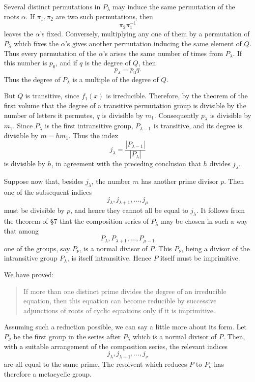 \documentclass[11pt,a4paper]{book}
\begin{document}
Several distinct permutations in \(P_\lambda\) may induce the same permutation of the roots \(\alpha\).  If \(\pi_1,\pi_2\) are two such permutations, then
\[
 \pi_2\pi_1^{-1}
\]
leaves the \(\alpha\)'s fixed.  Conversely, multiplying any one of them by a permutation of \(P_\lambda\) which fixes the \(\alpha\)'s gives another permutation inducing the same element of \(Q\).  Thus every permutation of the \(\alpha\)'s arises the same number of times from \(P_\lambda\).  If this number is \(p_0\), and if \(q\) is the degree of \(Q\), then
\[
 p_\lambda=p_0q.
\]
Thus the degree of \(P_\lambda\) is a multiple of the degree of \(Q\).

But \(Q\) is transitive, since \(f_1(x)\) is irreducible.  Therefore, by the theorem of the first volume that the degree of a transitive permutation group is divisible by the number of letters it permutes, \(q\) is divisible by \(m_1\).  Consequently \(p_\lambda\) is divisible by \(m_1\).  Since \(P_\lambda\) is the first intransitive group, \(P_{\lambda-1}\) is transitive, and its degree is divisible by \(m=hm_1\).  Thus the index
\[
 j_\lambda=\frac{|P_{\lambda-1}|}{|P_\lambda|}
\]
is divisible by \(h\), in agreement with the preceding conclusion that \(h\) divides \(j_\lambda\).

Suppose now that, besides \(j_\lambda\), the number \(m\) has another prime divisor \(p\).  Then one of the subsequent indices
\[
 j_\lambda,j_{\lambda+1},\ldots,j_\mu
\]
must be divisible by \(p\), and hence they cannot all be equal to \(j_\lambda\).  It follows from the theorem of \S 7 that the composition series of \(P_\lambda\) may be chosen in such a way that among
\[
 P_\lambda,P_{\lambda+1},\ldots,P_{\mu-1}
\]
one of the groups, say \(P_\nu\), is a normal divisor of \(P\).  This \(P_\nu\), being a divisor of the intransitive group \(P_\lambda\), is itself intransitive.  Hence \(P\) itself must be imprimitive.

We have proved:

\begin{quote}
If more than one distinct prime divides the degree of an irreducible equation, then this equation can become reducible by successive adjunctions of roots of cyclic equations only if it is imprimitive.
\end{quote}

Assuming such a reduction possible, we can say a little more about its form.  Let \(P_\nu\) be the first group in the series after \(P_\lambda\) which is a normal divisor of \(P\).  Then, with a suitable arrangement of the composition series, the relevant indices
\[
 j_\lambda,j_{\lambda+1},\ldots,j_\nu
\]
are all equal to the same prime.  The resolvent which reduces \(P\) to \(P_\nu\) has therefore a metacyclic group.
\end{document}
